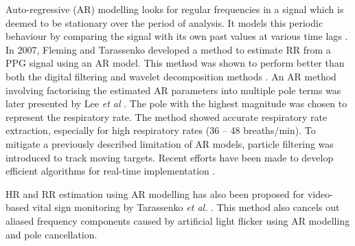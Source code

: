 Auto-regressive (AR) modelling looks for regular frequencies in a signal which is deemed to be stationary over the period of analysis. It models this periodic behaviour by comparing the signal with its own past values at various time lags \cite{takalo2005tutorial}. In 2007, Fleming and Tarassenko developed a method to estimate RR from a PPG signal using an AR model. This method was shown to perform better than both the digital filtering and wavelet decomposition methods \cite{fleming2007comparison}. An AR method involving factorising the estimated AR parameters into multiple pole terms was later presented by Lee \textit{et al} \cite{lee2010respiratory}. The pole with the highest magnitude was chosen to represent the respiratory rate. The method showed accurate respiratory rate extraction, especially for high respiratory rates (36 – 48 breaths/min). To mitigate a previously described limitation of AR models, particle filtering was introduced to track moving targets. Recent efforts have been made to develop efficient algorithms for real-time implementation \cite{hong2007design}. 

HR and RR estimation using AR modelling has also been proposed for video-based vital sign monitoring by Tarassenko \textit{et al.} \cite{tarassenko2014non}. This method also cancels out aliased frequency components caused by artificial light flicker using AR modelling and pole cancellation.
